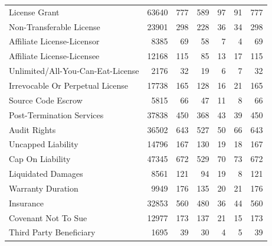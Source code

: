 \begin{tabular}{lrrrrrr}
License Grant & 63640 & 777 & 589 & 97 & 91 & 777 \\
Non-Transferable License & 23901 & 298 & 228 & 36 & 34 & 298 \\
Affiliate License-Licensor & 8385 & 69 & 58 & 7 & 4 & 69 \\
Affiliate License-Licensee & 12168 & 115 & 85 & 13 & 17 & 115 \\
Unlimited/All-You-Can-Eat-License & 2176 & 32 & 19 & 6 & 7 & 32 \\
Irrevocable Or Perpetual License & 17738 & 165 & 128 & 16 & 21 & 165 \\
Source Code Escrow & 5815 & 66 & 47 & 11 & 8 & 66 \\
Post-Termination Services & 37838 & 450 & 368 & 43 & 39 & 450 \\
Audit Rights & 36502 & 643 & 527 & 50 & 66 & 643 \\
Uncapped Liability & 14796 & 167 & 130 & 19 & 18 & 167 \\
Cap On Liability & 47345 & 672 & 529 & 70 & 73 & 672 \\
Liquidated Damages & 8561 & 121 & 94 & 19 & 8 & 121 \\
Warranty Duration & 9949 & 176 & 135 & 20 & 21 & 176 \\
Insurance & 32853 & 560 & 480 & 36 & 44 & 560 \\
Covenant Not To Sue & 12977 & 173 & 137 & 21 & 15 & 173 \\
Third Party Beneficiary & 1695 & 39 & 30 & 4 & 5 & 39 \\
\bottomrule
\end{tabular}
